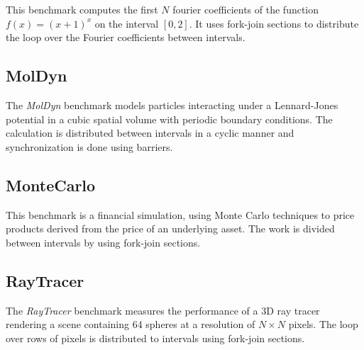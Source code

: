 This benchmark computes the first $N$ fourier coefficients of the
function $f(x) = (x+1)^x$ on the interval $[0,2]$. It uses fork-join
sections to distribute the loop over the Fourier coefficients between
intervals.

\subsection*{MolDyn}

The \emph{MolDyn} benchmark models particles interacting under a
Lennard-Jones potential in a cubic spatial volume with periodic
boundary conditions. The calculation is distributed between intervals
in a cyclic manner and synchronization is done using barriers.

\subsection*{MonteCarlo}

This benchmark is a financial simulation, using Monte Carlo techniques
to price products derived from the price of an underlying asset. The
work is divided between intervals by using fork-join sections.

\subsection*{RayTracer}

The \emph{RayTracer} benchmark measures the performance of a 3D ray
tracer rendering a scene containing 64 spheres at a resolution of $N
\times N$ pixels. The loop over rows of pixels is distributed to
intervals using fork-join sections.


